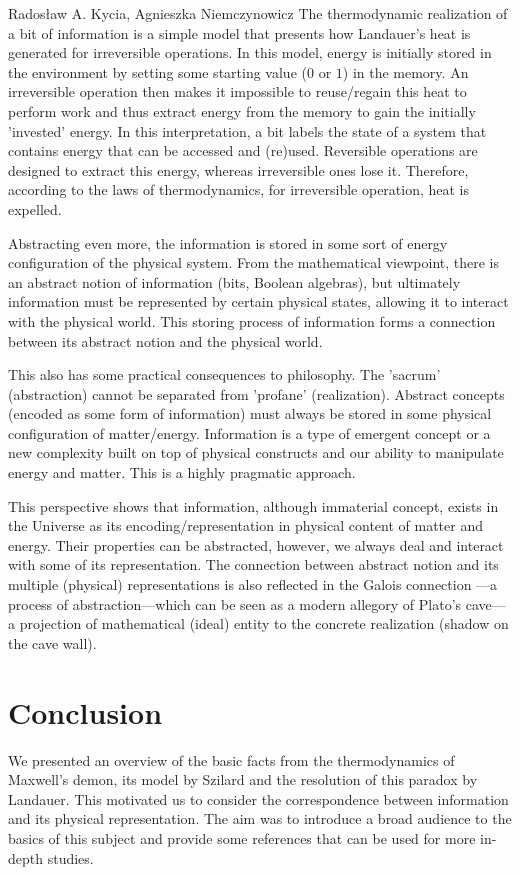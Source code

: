 \begin{artengenv2auth}{Rados\l aw A. Kycia, Agnieszka Niemczynowicz}
The thermodynamic realization of a bit of information is a simple model that presents how Landauer's heat is generated for irreversible operations. In this model, energy is initially stored in the environment by setting some starting value ($0$ or $1$) in the memory. An irreversible operation then makes it impossible to reuse/regain this heat to perform work and thus extract energy from the memory to gain the initially 'invested' energy. In this interpretation, a bit labels the state of a system that contains energy that can be accessed and (re)used. Reversible operations are designed to extract this energy, whereas irreversible ones lose it. Therefore, according to the laws of thermodynamics, for irreversible operation, heat is expelled. 

Abstracting even more, the information is stored in some sort of energy configuration of the physical system. From the mathematical viewpoint, there is an abstract notion of information (bits, Boolean algebras), but ultimately information must be represented by certain physical states, allowing it to interact with the physical world. This storing process of information forms a connection between its abstract notion and the physical world.

This also has some practical consequences to philosophy. The 'sacrum' (abstraction) cannot be separated from 'profane' (realization). Abstract concepts (encoded as some form of information) must always be stored in some physical configuration of matter/energy. Information is a type of emergent concept or a new complexity built on top of physical constructs and our ability to manipulate energy and matter. This is a highly pragmatic approach. 

This perspective shows that information, although immaterial concept, exists in the Universe as its encoding/representation in physical content of matter and energy. Their properties can be abstracted, however, we always deal and interact with some of its representation. The connection between abstract notion and its multiple (physical) representations is also reflected in the Galois connection \parencite{CategoryGentleIntroduction}---a process of abstraction---which can be seen as a modern allegory of Plato's cave---a projection of mathematical (ideal) entity to the concrete realization (shadow on the cave wall).



\section{Conclusion}
We presented an overview of the basic facts from the thermodynamics of Maxwell's demon, its model by Szilard and the resolution of this paradox by Landauer. This motivated us to consider the correspondence between information and its physical representation. The aim was to introduce a broad audience to the basics of this subject and provide some references that can be used for more in-depth studies.



\end{artengenv2auth}
